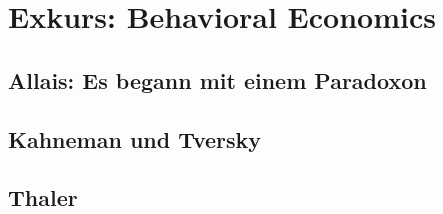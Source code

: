 %
%
%

\chapter{Exkurs: Behavioral Economics}
\label{Behavioral}

\section{Allais: Es begann mit einem Paradoxon}

\section{Kahneman und Tversky}

\section{Thaler}